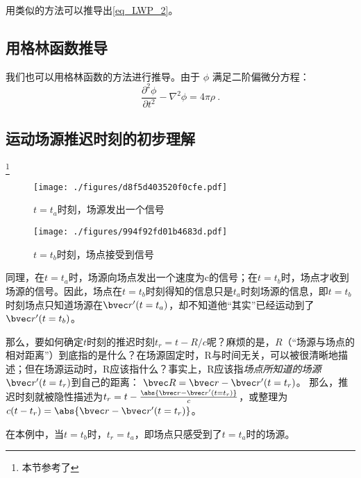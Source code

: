 用类似的方法可以推导出\autoref{eq_LWP_2}。

\subsection{用格林函数推导}
我们也可以用格林函数的方法进行推导。由于 $\phi$ 满足二阶偏微分方程：
\begin{equation}
\frac{\partial^2 \phi}{\partial t^2}-\nabla^2 \phi= 4\pi \rho~.
\end{equation}

\subsection{运动场源推迟时刻的初步理解}
\footnote{本节参考了\cite{GriffE}}
\begin{figure}[ht]
\centering
\texttt{[image: ./figures/d8f5d403520f0cfe.pdf]}
\caption{$t=t_a$时刻，场源发出一个信号} \label{fig_LWP_1}
\end{figure}
\begin{figure}[ht]
\centering
\texttt{[image: ./figures/994f92fd01b4683d.pdf]}
\caption{$t=t_b$时刻，场点接受到信号} \label{fig_LWP_2}
\end{figure}
同理，在$t=t_a$时，场源向场点发出一个速度为c的信号；在$t=t_b$时，场点才收到场源的信号。因此，场点在$t=t_b$时刻得知的信息只是$t_a$时刻场源的信息，即$t=t_b$时刻场点只知道场源在$\bvec r'(t=t_a)$，却不知道他“其实”已经运动到了$\bvec r'(t=t_b)$。

那么，要如何确定$t$时刻的推迟时刻$t_r=t-R/c$呢？麻烦的是，$R$（“场源与场点的相对距离”）到底指的是什么？在场源固定时，R与时间无关，可以被很清晰地描述；但在场源运动时，R应该指什么？事实上，R应该指\textsl{场点所知道的场源}$\bvec r'(t=t_r)$到自己的距离： $\bvec R = \bvec r - \bvec r'(t=t_r)$。
那么，推迟时刻就被隐性描述为$t_r=t-\frac{\abs{\bvec r - \bvec r'(t=t_r)}}{c}$，或整理为$c(t-t_r)=\abs{\bvec r - \bvec r'(t=t_r)}$。

在本例中，当$t=t_b$时，$t_r=t_a$，即场点只感受到了$t=t_a$时的场源。
